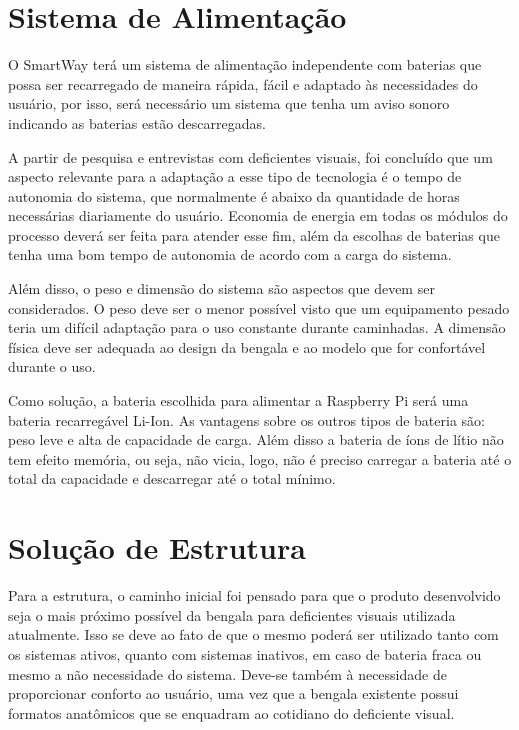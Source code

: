 \section{Sistema de Alimentação}

O SmartWay terá um sistema de alimentação independente com baterias que possa ser recarregado de maneira  rápida, fácil e adaptado às necessidades do usuário, por isso, será necessário um sistema que tenha um aviso sonoro indicando as baterias estão descarregadas. 

A partir de pesquisa e entrevistas com deficientes visuais, foi concluído que um aspecto relevante para a adaptação a esse tipo de tecnologia é o tempo de autonomia do sistema, que normalmente é abaixo da quantidade de horas necessárias diariamente do usuário. Economia de energia em todas os módulos do processo deverá ser feita para atender esse fim, além da escolhas de baterias que tenha uma bom tempo de autonomia de acordo com a carga do sistema.

Além disso, o peso e dimensão do sistema são aspectos que devem ser considerados. O peso deve ser o menor possível visto que um equipamento pesado teria um difícil adaptação para o uso constante durante caminhadas. A dimensão física deve ser adequada ao design da bengala e ao modelo que for confortável durante o uso.

Como solução, a bateria escolhida para alimentar a Raspberry Pi será uma bateria recarregável Li-Ion. As vantagens sobre os outros tipos de bateria são: peso leve e alta de capacidade de carga. Além disso a bateria de íons de lítio não tem efeito memória, ou seja, não vicia, logo,  não é preciso carregar a bateria até o total da capacidade e descarregar até o total mínimo.
	

\section{Solução de Estrutura}

Para a estrutura, o caminho inicial foi pensado para que o produto desenvolvido seja o mais próximo possível da bengala para deficientes visuais utilizada atualmente. Isso se deve ao fato de que o mesmo poderá ser utilizado tanto com os sistemas ativos, quanto com sistemas inativos, em caso de bateria fraca ou mesmo a não necessidade do sistema. Deve-se também à necessidade de proporcionar conforto ao usuário, uma vez que a bengala existente possui formatos anatômicos que se enquadram ao cotidiano do deficiente visual.

